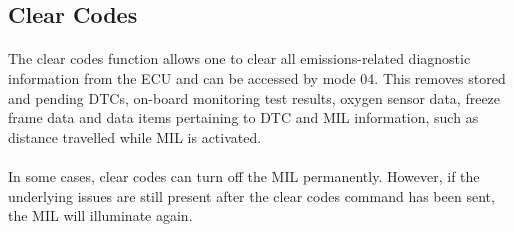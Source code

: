 	\subsection{Clear Codes}{
		\paragraph{}{
		The clear codes function allows one to clear all emissions-related diagnostic information from the ECU and can be accessed by mode 04. This removes stored and pending DTCs, on-board monitoring test results, oxygen sensor data, freeze frame data and data items pertaining to DTC and MIL information, such as distance travelled while MIL is activated.
		}
		\paragraph{}{
		In some cases, clear codes can turn off the MIL permanently. However, if the underlying issues are still present after the clear codes command has been sent, the MIL will illuminate again.
		}
	}
	\label{ssec:ClearCodes}
	
